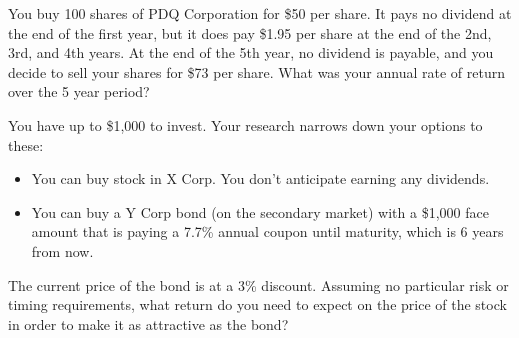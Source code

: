 \documentclass[12pt]{exam}
\begin{document}
\begin{questions}
    \question You buy 100 shares of PDQ Corporation for \$50 per share.  It pays no dividend at the end
    of the first year, but it does pay \$1.95 per share at the end of the 2nd, 3rd, and 4th years.  At
    the end of the 5th year, no dividend is payable, and you decide to sell your shares for \$73 per share.
    What was your annual rate of return over the 5 year period?
    \vspace{1.5in}

    \question You have up to \$1,000 to invest.  Your research narrows down your options to these:
    \begin{itemize}
        \item You can buy stock in X Corp.  You don't anticipate earning any dividends.
        \item You can buy a Y Corp bond (on the secondary market) with a \$1,000 face amount that is paying a
        7.7\% annual coupon until maturity, which is 6 years from now.
    \end{itemize}
    The current price of the bond is at a 3\% discount.  Assuming no particular risk or timing requirements, what
    return do you need to expect on the price of the stock in order to make it as attractive as the bond?

\end{questions}
\end{document}
